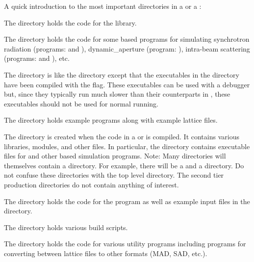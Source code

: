 \documentclass{hitec}     %
\begin{document}
A quick introduction to the most important directories in a  or a :
\begin{description}
%
\vspace{-0.4 ex}
\item[bmad] \Newline
The  directory holds the code for the \bmad library.
%
\vspace{-0.4 ex}
\item[bsim] \Newline
The  directory holds the code for some \bmad based programs for simulating
synchrotron radiation (programs:  and ), dynamic_aperture (program:
), intra-beam scattering (programs:  and ), etc.
%
\vspace{-0.4 ex}
\item[debug] \Newline
The  directory is like the  directory except that the executables in the
 directory have been compiled with the  flag. These executables can be used
with a debugger but, since they typically run much slower than their counterparts in
, these executables should not be used for normal running.
%
\vspace{-0.4 ex}
\item[examples] \Newline
The  directory holds example programs along with example lattice files.
%
\vspace{-0.4 ex}
\item[production] \Newline
The  directory is created when the code in a  or  is
compiled. It contains various libraries, modules, and other files. In particular, the
 directory contains executable files for \tao and other \bmad based simulation
programs. Note: Many directories will themselves contain a  directory. For example,
there will be a  and a  directory. Do not confuse these
directories with the top level  directory. The second tier production directories do
not contain anything of interest.
%
\vspace{-0.4 ex}
\item[tao] \Newline
The  directory holds the code for the \tao program as well as example input
files in the  directory.
%
\vspace{-0.4 ex}
\item[util] \Newline
The  directory holds various build scripts.
%
\vspace{-0.4 ex}
\item[util_programs] \Newline
The  directory holds the code for various utility programs including programs for
converting between \bmad lattice files to other formats (MAD, SAD, etc.).

\end{description}
\end{document}
